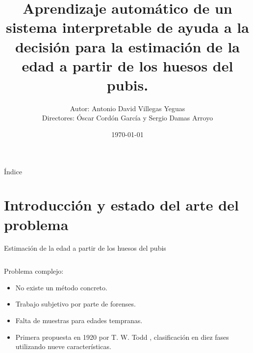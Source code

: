 \documentclass{beamer}
\title{Aprendizaje automático de un sistema interpretable de ayuda a la decisión para la estimación de la edad a partir de los huesos del pubis.}
\date{\today}
\author{\small Autor: Antonio David Villegas Yeguas \\ Directores: Óscar Cordón García y Sergio Damas Arroyo}
\institute[UGR]{Universidad de Granada\\
\medskip
\textit{advy99@correo.ugr.es}\\
\medskip
\url{https://github.com/advy99/TFG}
\doclicenseThis
}
\begin{document}
 \maketitle

\begin{frame}{Índice}
\tableofcontents
\end{frame}




\section{Introducción y estado del arte del problema}
\begin{frame}{Estimación de la edad a partir de los huesos del pubis}

	\begin{columns}[T]
		\begin{column}{.4\textwidth}
			Problema complejo:
			\begin{itemize}
				\item No existe un método concreto.
				\item Trabajo subjetivo por parte de forenses.
				\item Falta de muestras para edades tempranas.
				\item Primera propuesta en 1920 por T. W. Todd \cite{todd}, clasificación en diez fases utilizando nueve características.
			\end{itemize}

		\end{column}


\end{columns}
\end{frame}
\end{document}
